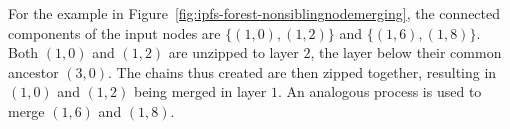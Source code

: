 \documentclass[10pt,twocolumn,twoside]{IEEEtran}
\newenvironment{stusubfig}[1]
{
	\begin{figure}[#1]
	\begin{center}
}
{
	\end{center}
	\end{figure}
}
\begin{document}
For the example in Figure~\ref{fig:ipfs-forest-nonsiblingnodemerging}, the connected components of the input nodes are $\{(1,0),(1,2)\}$ and $\{(1,6),(1,8)\}$. Both $(1,0)$ and $(1,2)$ are unzipped to layer $2$, the layer below their common ancestor $(3,0)$. The chains thus created are then zipped together, resulting in $(1,0)$ and $(1,2)$ being merged in layer $1$. An analogous process is used to merge $(1,6)$ and $(1,8)$.

\begin{stusubfig}{p}
	\hspace{8mm}%
	\\
	\hspace{8mm}%

\end{stusubfig}
\end{document}
